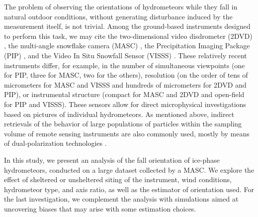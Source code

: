 \documentclass[draft]{agujournal2019}
\begin{document}
The problem of observing the orientations of hydrometeors while they fall in natural outdoor conditions, without generating disturbance induced by the measurement itself, is not trivial. Among the ground-based instruments designed to perform this task, we may cite the two-dimensional video disdrometer (2DVD) \cite{Kruger_JAOT_2002}, the multi-angle snowflake camera (MASC) \cite{Garrett_AMT_2012}, the Precipitation Imaging Package (PIP) \cite{Pettersen_atmosphere_2020}, and the Video In Situ Snowfall Sensor (VISSS) \cite{Maahn_AMT_2024}. These relatively recent instruments differ, for example, in the number of simultaneous viewpoints (one for PIP, three for MASC, two for the others), resolution (on the order of tens of micrometers for MASC and VISSS and hundreds of micrometers for 2DVD and PIP), or instrumental structure (compact for MASC and 2DVD and open-field for PIP and VISSS). These sensors allow for direct microphysical investigations based on pictures of individual hydrometeors. As mentioned above, indirect retrievals of the behavior of large populations of particles within the sampling volume of remote sensing instruments are also commonly used, mostly by means of dual-polarization technologies \cite{Matrosov_JAS_2005}.

In this study, we present an analysis of the fall orientation of ice-phase hydrometeors, conducted on a large dataset collected by a MASC. We explore the effect of sheltered or unsheltered siting of the instrument, wind conditions, hydrometeor type, and axis ratio, as well as the estimator of orientation used. For the last investigation, we complement the analysis with simulations aimed at uncovering biases that may arise with some estimation choices.
\end{document}
